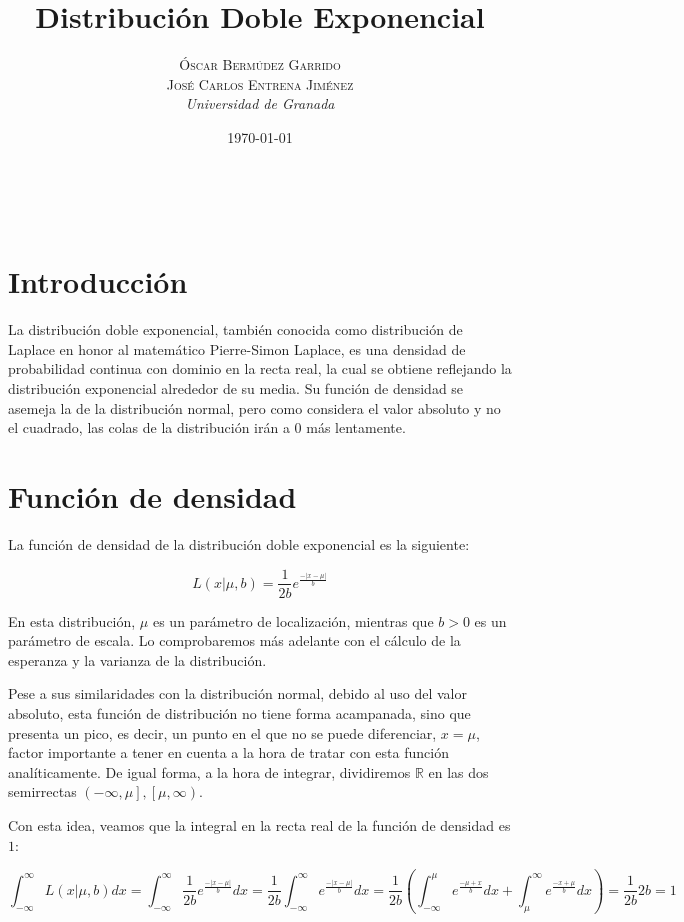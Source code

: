 \documentclass[a4paper, 10pt]{article} %
\title{\textbf{Distribución Doble Exponencial}\\ %
\vspace{20 pt}
} %
\author{\textsc{Óscar Bermúdez Garrido\\José Carlos Entrena Jiménez} %
\\{\textit{Universidad de Granada}}} %
\date{\today} %
\makeatletter
\renewcommand{\maketitle}{ %
\begin{center} %
{\Huge\@title} %
\end{center}

\vspace{20pt} %

\begin{flushright} %
{\large\@author} %
\\\@date %

\vspace{40pt} %
\end{flushright}
\renewcommand{\baselinestretch}{0.5}

}
\makeatother
\begin{document}
\maketitle
\tableofcontents
\pagebreak

\section{Introducción}

	La distribución doble exponencial, también conocida como distribución de Laplace en honor al matemático
	Pierre-Simon Laplace, es una densidad de probabilidad continua con dominio en la recta real, la cual se obtiene
	reflejando la distribución exponencial alrededor de su media. Su función de densidad se asemeja la de la
	distribución normal, pero como considera el valor absoluto y no el cuadrado, las colas de la distribución
	irán a $0$ más lentamente. 

\section{Función de densidad}

	La función de densidad de la distribución doble exponencial es la siguiente: 
	
	$$L(x|\mu, b)=\frac{1}{2b}e^\frac{-|x-\mu|}{b}$$
	
	En esta distribución, $\mu$ es un parámetro de localización, mientras que $b > 0$ es un parámetro de escala.
	Lo comprobaremos más adelante con el cálculo de la esperanza y la varianza de la distribución. 
	
	Pese a sus similaridades con la distribución normal, debido al uso del valor absoluto, esta función de
	distribución no tiene forma acampanada, sino que presenta un pico, es decir, un punto en el que no se puede
	diferenciar, $x = \mu$, factor importante a tener en cuenta a la hora de tratar con esta función analíticamente.
	De igual forma, a la hora de integrar, dividiremos $\mathbb{R}$ en las dos semirrectas $\left(-\infty, \mu\right],
	\left[\mu, \infty\right)$.
	
	Con esta idea, veamos que la integral en la recta real de la función de densidad es $1$: 
	
	$$\int_{-\infty}^{\infty} L(x|\mu, b)dx = \int_{-\infty}^{\infty} \frac{1}{2b}e^\frac{-|x-\mu|}{b}dx =
	\frac{1}{2b}\int_{-\infty}^{\infty}e^\frac{-|x-\mu|}{b}dx = 
	\frac{1}{2b}\left( \int_{-\infty}^{\mu}e^\frac{-\mu+x}{b}dx + \int_{\mu}^{\infty}e^\frac{-x+\mu}{b}dx \right) =
	\frac{1}{2b}2b = 1$$
 
\end{document}
